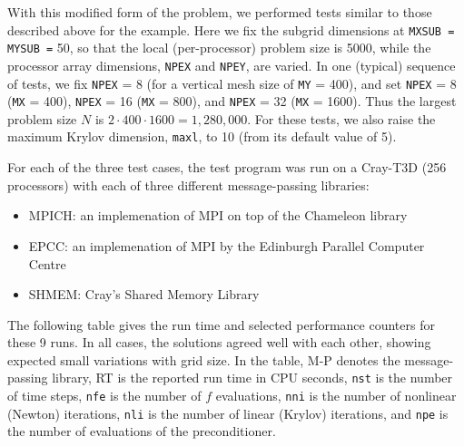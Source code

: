 With this modified form of the problem, we performed tests similar to those
described above for the example. Here we fix the subgrid dimensions at
{\tt MXSUB = MYSUB =} 50, so that the local (per-processor) problem size is 5000,
while the processor array dimensions, {\tt NPEX} and {\tt NPEY}, are varied.
In one (typical) sequence of tests, we fix {\tt NPEX} = 8 (for a vertical
mesh size of {\tt MY} = 400), and set {\tt NPEX} = 8 ({\tt MX} = 400),
{\tt NPEX} = 16 ({\tt MX} = 800), and {\tt NPEX} = 32 ({\tt MX} = 1600). 
Thus the largest problem size $N$ is $2 \cdot 400 \cdot 1600 = 1,280,000$. 
For these tests, we also raise the maximum Krylov dimension, {\tt maxl},
to 10 (from its default value of 5).

For each of the three test cases, the test program was run on a Cray-T3D
(256 processors) with each of three different message-passing libraries:

\begin{itemize}
\item  MPICH: an implemenation of MPI on top of the Chameleon library \cite
{GL92}

\item  EPCC: an implemenation of MPI by the Edinburgh Parallel Computer
Centre \cite{CCS95}

\item  SHMEM: Cray's Shared Memory Library
\end{itemize}

The following table gives the run time and selected performance counters for
these 9 runs. In all cases, the solutions agreed well with each other,
showing expected small variations with grid size. In the table, M-P denotes
the message-passing library, RT is the reported run time in CPU seconds, 
{\tt nst} is the number of time steps, {\tt nfe} is the number of $f$
evaluations, {\tt nni} is the number of nonlinear (Newton) iterations,
{\tt nli} is the number of linear (Krylov) iterations, and {\tt npe} is the
number of evaluations of the preconditioner.

